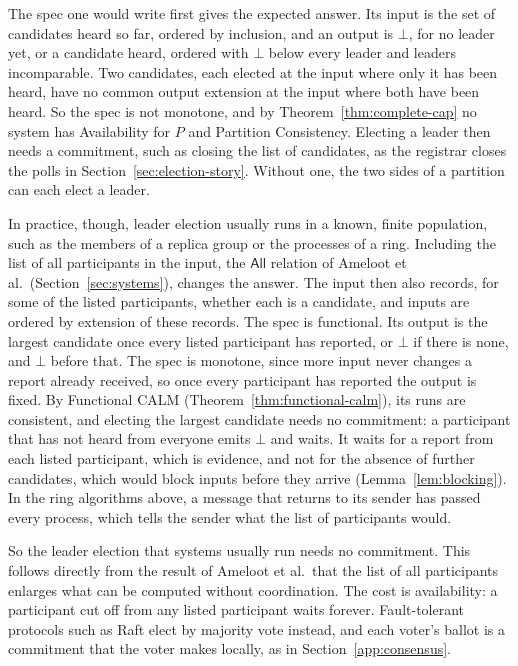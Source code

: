 \documentclass[sigconf]{cidr-2027}
\theoremstyle{remark}
\newcommand{\commitment}{commitment\xspace}
\newcommand{\outnoun}{output extension\xspace}%
\begin{document}
The spec one would write first gives the expected answer. Its input is the
set of candidates heard so far, ordered by inclusion, and an output is $\bot$,
for no leader yet, or a candidate heard, ordered with $\bot$ below every
leader and leaders incomparable. Two candidates, each elected at the input
where only it has been heard, have no common \outnoun at the input where both
have been heard. So the spec is not monotone, and by
Theorem~\ref{thm:complete-cap} no system has Availability for $P$ and
Partition Consistency. Electing a leader then needs a \commitment, such as
closing the list of candidates, as the registrar closes the polls in
Section~\ref{sec:election-story}. Without one, the two sides of a partition
can each elect a leader.

In practice, though, leader election usually runs in a known, finite
population, such as the members of a replica group or the processes of a
ring. Including the list of all participants in the input, the
$\mathsf{All}$ relation of Ameloot et al.\ (Section~\ref{sec:systems}),
changes the answer. The input then also records, for some of the listed
participants, whether each is a candidate, and inputs are ordered by extension
of these records. The spec is functional. Its output is the largest
candidate once every listed participant has reported, or $\bot$ if there is
none, and $\bot$ before that. The spec is monotone, since more input never
changes a report already received, so once every participant has reported the
output is fixed. By Functional CALM (Theorem~\ref{thm:functional-calm}), its
runs are consistent, and electing the largest candidate needs no
\commitment: a participant that has not heard from everyone emits $\bot$ and
waits. It waits for a report from each listed participant, which is
evidence, and not for the absence of further candidates, which would block
inputs before they arrive (Lemma~\ref{lem:blocking}). In the ring algorithms
above, a message that returns to its sender has passed every process, which
tells the sender what the list of participants would.

So the leader election that systems usually run needs no \commitment. This
follows directly from the result of Ameloot et al.\ that the list of all
participants enlarges what can be computed without coordination. The cost is
availability: a participant cut off from any listed participant waits
forever. Fault-tolerant protocols such as Raft elect by majority vote instead,
and each voter's ballot is a \commitment that the voter makes locally, as in
Section~\ref{app:consensus}.
\end{document}
